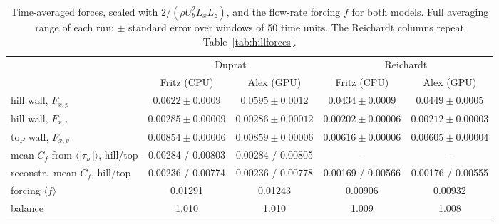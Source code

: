 \documentclass[11pt,a4paper]{article}
\begin{document}
\begin{table}[htbp]
\centering
\footnotesize
\setlength{\tabcolsep}{4pt}
\caption{Time-averaged forces, scaled with $2/(\rho U_b^2 L_x L_z)$, and the
flow-rate forcing $f$ for both models. Full averaging range of each run;
$\pm$ standard error over windows of 50 time units. The Reichardt columns
repeat Table~\ref{tab:hillforces}.}
\label{tab:hilldupforces}
\begin{tabular}{@{}lcccc@{}}
\toprule
 & \multicolumn{2}{c}{Duprat} & \multicolumn{2}{c}{Reichardt} \\
 & Fritz (CPU) & Alex (GPU) & Fritz (CPU) & Alex (GPU) \\
\midrule
hill wall, $F_{x,p}$ & $0.0622 \pm 0.0009$ & $0.0595 \pm 0.0012$ & $0.0434 \pm 0.0009$ & $0.0449 \pm 0.0005$ \\
hill wall, $F_{x,v}$ & $0.00285 \pm 0.00009$ & $0.00286 \pm 0.00012$ & $0.00202 \pm 0.00006$ & $0.00212 \pm 0.00003$ \\
top wall, $F_{x,v}$ & $0.00854 \pm 0.00006$ & $0.00859 \pm 0.00006$ & $0.00616 \pm 0.00006$ & $0.00605 \pm 0.00004$ \\
mean $C_f$ from $\langle|\tau_w|\rangle$, hill/top & 0.00284 / 0.00803 & 0.00284 / 0.00805 & -- & -- \\
reconstr.\ mean $C_f$, hill/top & 0.00236 / 0.00774 & 0.00236 / 0.00778 & 0.00169 / 0.00566 & 0.00176 / 0.00555 \\
forcing $\langle f\rangle$ & 0.01291 & 0.01243 & 0.00906 & 0.00932 \\
balance & 1.010 & 1.010 & 1.009 & 1.008 \\
\bottomrule
\end{tabular}
\end{table}
\end{document}
